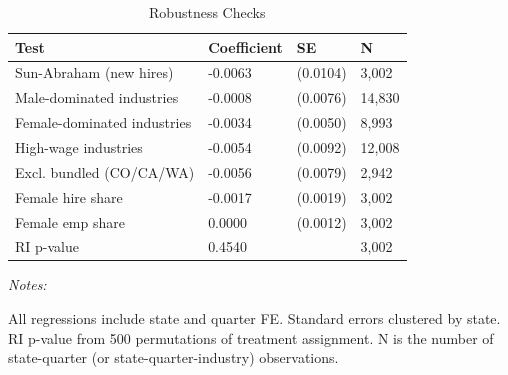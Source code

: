 \begin{table}[!h]
\centering
\caption{\label{tab:robustness}Robustness Checks}
\centering
\begin{threeparttable}
\begin{tabular}[t]{llll}
\toprule
Test & Coefficient & SE & N\\
\midrule
Sun-Abraham (new hires) & -0.0063 & (0.0104) & 3,002\\
Male-dominated industries & -0.0008 & (0.0076) & 14,830\\
Female-dominated industries & -0.0034 & (0.0050) & 8,993\\
High-wage industries & -0.0054 & (0.0092) & 12,008\\
Excl. bundled (CO/CA/WA) & -0.0056 & (0.0079) & 2,942\\
\addlinespace
Female hire share & -0.0017 & (0.0019) & 3,002\\
Female emp share & 0.0000 & (0.0012) & 3,002\\
RI p-value & 0.4540 &  & 3,002\\
\bottomrule
\end{tabular}
\begin{tablenotes}[para]
\item \textit{Notes:} 
\item All regressions include state and quarter FE. Standard errors clustered by state. RI p-value from 500 permutations of treatment assignment. N is the number of state-quarter (or state-quarter-industry) observations.
\end{tablenotes}
\end{threeparttable}
\end{table}
